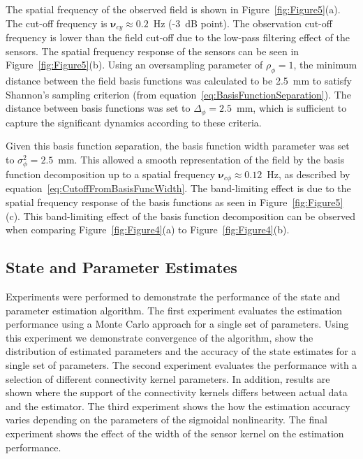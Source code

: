 \documentclass[12pt]{iopart}
\begin{document}
The spatial frequency of the observed field is shown in Figure~\ref{fig:Figure5}(a). The cut-off frequency is $\boldsymbol{\nu}_{cy} \approx 0.2$~Hz (-3~dB point). The observation cut-off frequency is lower than the field cut-off due to the low-pass filtering effect of the sensors. The spatial frequency response of the sensors can be seen in Figure~\ref{fig:Figure5}(b). Using an oversampling parameter of $\rho_{\phi}=1$, the minimum distance between the field basis functions was calculated to be 2.5~mm to satisfy Shannon's sampling criterion (from equation~\ref{eq:BasisFunctionSeparation}). The distance between basis functions was set to $\Delta_{\phi}=2.5$~mm, which is sufficient to capture the significant dynamics according to these criteria.

Given this basis function separation, the basis function width parameter was set to $\sigma_{\phi}^2=2.5$~mm. This allowed a smooth representation of the field by the basis function decomposition up to a spatial frequency $\boldsymbol{\nu}_{c\phi} \approx 0.12$~Hz, as described by equation~\ref{eq:CutoffFromBasisFuncWidth}. The band-limiting effect is due to the spatial frequency response of the basis functions as seen in Figure~\ref{fig:Figure5}(c). This band-limiting effect of the basis function decomposition can be observed when comparing Figure~\ref{fig:Figure4}(a) to Figure~\ref{fig:Figure4}(b).

\subsection{State and Parameter Estimates} 
\label{sec:state_and_param_results}
Experiments were performed to demonstrate the performance of the state and parameter estimation algorithm. The first experiment evaluates the estimation performance using a Monte Carlo approach for a single set of parameters. Using this experiment we demonstrate convergence of the algorithm, show the distribution of estimated parameters and the accuracy of the state estimates for a single set of parameters. The second experiment evaluates the performance with a selection of different connectivity kernel parameters. In addition, results are shown where the support of the connectivity kernels differs between actual data and the estimator. The third experiment shows the how the estimation accuracy varies depending on the parameters of the sigmoidal nonlinearity. The final experiment shows the effect of the width of the sensor kernel on the estimation performance.
\end{document}
